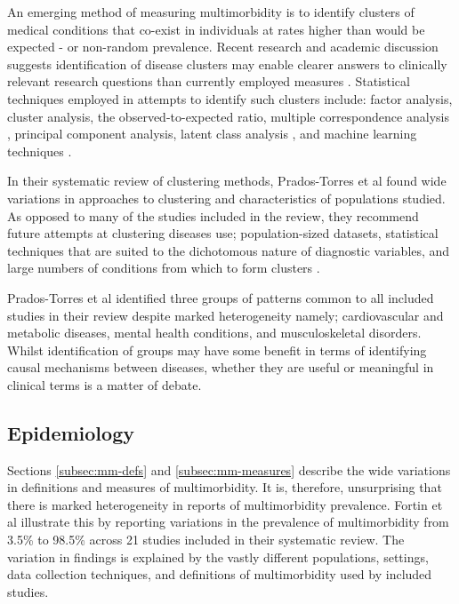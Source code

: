 \documentclass[12pt,]{report}
\begin{document}
An emerging method of measuring multimorbidity is to identify clusters
of medical conditions that co-exist in individuals at rates higher than
would be expected - or non-random prevalence. Recent research and
academic discussion suggests identification of disease clusters may
enable clearer answers to clinically relevant research questions than
currently employed measures
\citetext{\citealp{RN96}; \citealp[RN109;][]{RN98}; \citealp{RN99}; \citealp{RN188}; \citealp{RN31}; \citealp{RN64}}.
Statistical techniques employed in attempts to identify such clusters
include: factor analysis, cluster analysis, the observed-to-expected
ratio, multiple correspondence analysis \citep{RN98, RN301}, principal
component analysis, latent class analysis \citep{RN109, RN365}, and
machine learning techniques \citep{RN273}.

In their systematic review of clustering methods, Prados-Torres et al
\citeyearpar{RN98} found wide variations in approaches to clustering and
characteristics of populations studied. As opposed to many of the
studies included in the review, they recommend future attempts at
clustering diseases use; population-sized datasets, statistical
techniques that are suited to the dichotomous nature of diagnostic
variables, and large numbers of conditions from which to form clusters
\citep{RN98}.

Prados-Torres et al \citeyearpar{RN98} identified three groups of
patterns common to all included studies in their review despite marked
heterogeneity namely; cardiovascular and metabolic diseases, mental
health conditions, and musculoskeletal disorders. Whilst identification
of groups may have some benefit in terms of identifying causal
mechanisms between diseases, whether they are useful or meaningful in
clinical terms is a matter of debate.

\subsection{Epidemiology}\label{subsec:mm-epi}

Sections \ref{subsec:mm-defs} and \ref{subsec:mm-measures} describe the
wide variations in definitions and measures of multimorbidity. It is,
therefore, unsurprising that there is marked heterogeneity in reports of
multimorbidity prevalence. Fortin et al \citeyearpar{RN56} illustrate
this by reporting variations in the prevalence of multimorbidity from
3.5\% to 98.5\% across 21 studies included in their systematic review.
The variation in findings is explained by the vastly different
populations, settings, data collection techniques, and definitions of
multimorbidity used by included studies.
\end{document}
